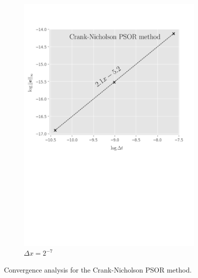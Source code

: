 \begin{figure}[H]
\begin{subfigure}{0.4\textwidth}
    \includegraphics[width=\textwidth]{chapters/chapter5/ConvergenceTimeCrankNicholsonLCP.pdf}
    \caption{$\Delta{t}=2^{-15},2^{-17},\dots,2^{-21}$}
    \caption*{$\Delta{x}=2^{-7}$}
    \label{fig:lcp:numericalresults:convergence_time_cranknicholson}
  \end{subfigure}
  \caption{Convergence analysis for the Crank-Nicholson PSOR method.}
  \label{fig:lcp:numericalresults:cranknicholson_convergence_analysis}
\end{figure}